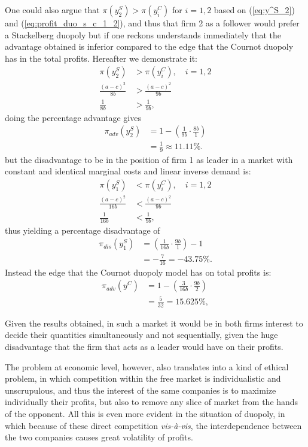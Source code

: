 \documentclass[12pt]{article}
\numberwithin{equation}{subsection}
\begin{document}
One could also argue that $\pi(y^S_2) > \pi (y^C_i)$ for $i = 1,2$ based on (\ref{eq:y^S_2}) and (\ref{eq:profit_duo_s_c_1_2}), and thus that firm 2 as a follower would prefer a Stackelberg duopoly but if one reckons understands immediately that the advantage obtained is inferior compared to the edge that the Cournot duopoly has in the total profits. Hereafter we demonstrate it: \begin{align*}
\pi(y^S_2) &> \pi(y^C_i), \quad i = 1,2\\
\frac{(a - c)^2}{8b} &> \frac{(a -c)^2}{9b}\\
\frac{1}{8b} &> \frac{1}{9b},
\end{align*}
doing the percentage advantage gives \begin{align*}
\pi_{adv}(y^S_2) &= 1 - \left(\frac{1}{9b} \cdot \frac{8b}{1}\right)\\
& = \frac{1}{9} \approx 11.11 \%.
\end{align*}
but the disadvantage to be in the position of firm 1 as leader in a market with constant and identical marginal costs and linear inverse demand is: \begin{align*}
\pi(y^S_1) &< \pi(y^C_i), \quad i = 1,2\\
\frac{(a - c)^2}{16b} &< \frac{(a -c)^2}{9b}\\
\frac{1}{16b} &< \frac{1}{9b},
\end{align*}
thus yielding a percentage disadvantage of\begin{align*}
\pi_{dis}(y^S_1) &= \left(\frac{1}{16b} \cdot \frac{9b}{1}\right) - 1\\
& = -\frac{7}{16} = -43.75\%.
\end{align*}
Instead the edge that the Cournot duopoly model has on total profits is: \begin{align*}
\pi_{adv}(y^C) &= 1 - \left(\frac{3}{16b} \cdot \frac{9b}{2}\right)\\
& = \frac{5}{32} = 15.625\%,
\end{align*}

Given the results obtained, in such a market it would be in both firms interest to decide their quantities simultaneously and not sequentially, given the huge disadvantage that the firm that acts as a leader would have on their profits. 

The problem at economic level, however, also translates into a kind of ethical problem, in which competition within the free market is individualistic and unscrupulous, and thus the interest of the same companies is to maximize individually their profits, but also to remove any slice of market from the hands of the opponent. All this is even more evident in the situation of duopoly, in which because of these direct competition \emph{vis-à-vis}, the interdependence between the two companies causes great volatility of profits.
\newpage
\end{document}
